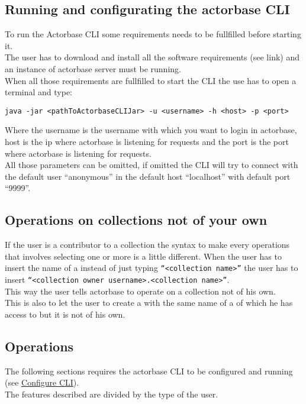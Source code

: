 \documentclass{scalatekids-article}
\begin{document}
\subsection{Running and configurating the actorbase CLI} %
To run the Actorbase CLI some requirements needs to be fullfilled before starting it.\\
The user has to download and install all the software requirements (see link) and an instance of 
actorbase server must be running.\\
When all those requirements are fullfilled to start the CLI the use has to open a terminal and type:\\
\begin{center}
  \texttt{java -jar <pathToActorbaseCLIJar> -u <username> -h <host> -p <port>}
\end{center}
Where the username is the username with which you want to login in actorbase, host is the ip where 
actorbase is listening for requests and the port is the port where actorbase is listening for 
requests.\\All those parameters can be omitted, if omitted the CLI will try to connect with the 
default user ``anonymous'' in the default host ``localhost'' with default port ``9999''. 

\subsection{Operations on collections not of your own}
\label{sec:contributoroperations}
If the user is a contributor to a collection the syntax to make every operations that involves selecting one or more 
 is a little different. When the user has to insert the name of a  instead of 
just typing \texttt{``<collection name>''} the user has to insert \texttt{``<collection owner username>.<collection name>''}.\\This way the user tells actorbase to operate on a collection not of his own.\\This is also to let the user to 
create a  with the same name of a  of which he has access to but it is not of 
his own. 

\subsection{Operations}

The following sections requires the actorbase CLI to be configured and
running (see \hyperref[sec:configurationcli]{Configure CLI}).\\
The features described are divided by the type of the user.\\
\end{document}
